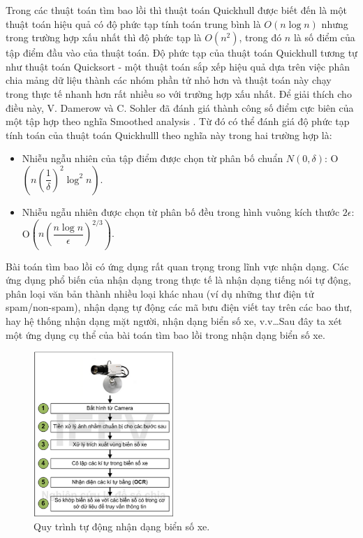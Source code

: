 \documentclass[12pt,a4paper,openany,oneside]{report}
\begin{document}
Trong các thuật toán tìm bao lồi thì thuật toán Quickhull \cite{David-2002, Rourke-1998} được biết đến là một thuật toán hiệu quả có độ phức tạp tính toán trung bình là $O(n \log n)$ nhưng trong trường hợp xấu nhất thì độ phức tạp là $O(n^2)$, trong đó $n$ là số điểm của tập điểm đầu vào của thuật toán. Độ phức tạp của thuật toán Quickhull tương tự như thuật toán Quicksort - một thuật toán sắp xếp hiệu quả dựa trên việc phân chia mảng dữ liệu thành các nhóm phần tử nhỏ hơn và thuật toán này chạy trong thực tế nhanh hơn rất nhiều so với trường hợp xấu nhất. Để giải thích cho điều này, V. Damerow và C. Sohler đã đánh giá thành công số điểm cực biên của một tập hợp theo nghĩa Smoothed analysis \cite{Damerow-2004}. Từ đó có thể đánh giá độ phức tạp tính toán của thuật toán Quickhulll theo nghĩa này trong hai trường hợp là:
\begin{itemize}
	\item Nhiễu ngẫu nhiên của tập điểm được chọn từ phân bố chuẩn $N(0, \delta)$: 
	O$\left( n \left(\dfrac{1}{\delta} \right)^2 \log^2 n\right) $.
	\item Nhiễu ngẫu nhiên được chọn từ phân bố đều trong hình vuông kích thước $2 \epsilon$: 
	O$\left( n \left(\dfrac{n \log n}{\epsilon} \right)^{2/3}\right). $
\end{itemize}

Bài toán tìm bao lồi có ứng dụng rất quan trọng trong lĩnh vực nhận dạng. Các ứng dụng phổ biến của nhận dạng trong thực tế là nhận dạng tiếng nói tự động, phân loại văn bản thành nhiều loại khác nhau (ví dụ những thư điện tử spam/non-spam), nhận dạng tự động các mã bưu điện viết tay trên các bao thư, hay hệ thống nhận dạng mặt người, nhận dạng biển số xe, v.v\ldots Sau đây ta xét một ứng dụng cụ thể của bài toán tìm bao lồi trong nhận dạng biển số xe. 
\begin{figure}[ht!]
	\begin{center}
		\includegraphics[width=200px]{./nhandang1.PNG}
		\caption{Quy trình tự động nhận dạng biển số xe.}
		\label{fig_dhandang1}
	\end{center}
\end{figure} 
\end{document}
